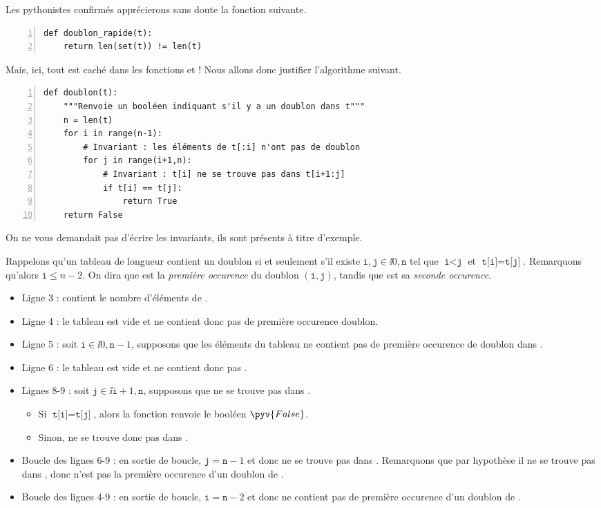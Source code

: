 Les pythonistes confirmés apprécierons sans doute la fonction suivante. 
\begin{Verbatim}[gobble=0,numbers=left]
def doublon_rapide(t):
    return len(set(t)) != len(t)
\end{Verbatim}
Mais, ici, tout est caché dans les fonctions  et  ! Nous allons donc justifier l'algorithme suivant. 
\begin{Verbatim}[gobble=0,numbers=left]
def doublon(t):
    """Renvoie un booléen indiquant s'il y a un doublon dans t"""
    n = len(t)
    for i in range(n-1):
        # Invariant : les éléments de t[:i] n'ont pas de doublon
        for j in range(i+1,n):
            # Invariant : t[i] ne se trouve pas dans t[i+1:j]
            if t[i] == t[j]:
                return True
    return False
\end{Verbatim}
\begin{rem}
  On ne vous demandait pas d'écrire les invariants, ils sont présents à titre d'exemple. 
\end{rem}
Rappelons qu'un tableau  de longueur  contient un doublon si et seulement s'il existe $\texttt{i},\texttt{j} \in \ii{0,\texttt{n}}$ tel que $\texttt{i}<\texttt{j}$ et $\texttt{t[i]} = \texttt{t[j]}$. 
Remarquons qu'alors $\texttt{i} \leq n-2$. On dira que  est la \emph{première occurence} du doublon $(\texttt{i},\texttt{j})$, tandis que  est sa \emph{seconde occurence}.
\begin{itemize}
  \item[\textbullet] Ligne 3 :  contient le nombre d'éléments de .
  \item[\textbullet] Ligne 4 : le tableau  est vide et ne contient donc pas de première occurence doublon.
  \item[\textbullet] Ligne 5 : soit $\texttt{i} \in \ii{0,\texttt{n}-1}$, supposons que les éléments du tableau  ne contient pas de première occurence de doublon dans . 
  \item[\textbullet] Ligne 6 : le tableau  est vide et ne contient donc pas . 
  \item[\textbullet] Lignes 8-9 : soit $\texttt{j} \in \ii{\texttt{i}+1,\texttt{n}}$, supposons que  ne se trouve pas dans . 
    \begin{itemize}
      \item Si $\texttt{t[i]} = \texttt{t[j]}$, alors la fonction renvoie le booléen $\pyv{False}$.
      \item Sinon,  ne se trouve donc pas dans .
    \end{itemize}
  \item[\textbullet] Boucle des lignes 6-9 : en sortie de boucle, $\texttt{j} = \texttt{n}-1$ et donc  ne se trouve pas dans . 
    Remarquons que par hypothèse il ne se trouve pas dans , donc  n'est pas la première occurence d'un doublon de .
  \item[\textbullet] Boucle des lignes 4-9 : en sortie de boucle, $\texttt{i} = \texttt{n}-2$ et donc  ne contient pas de première occurence d'un doublon de .
\end{itemize}
